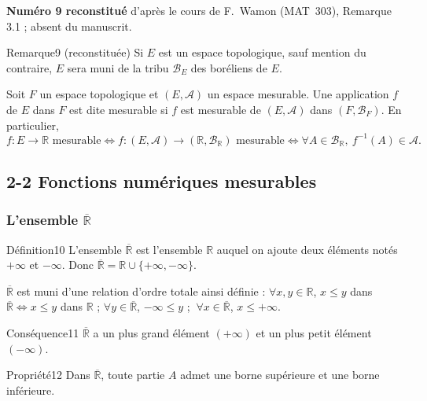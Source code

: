 \documentclass[11pt,a4paper]{article}
\newcommand{\R}{\mathbb{R}}
\newcommand{\Rb}{\overline{\mathbb{R}}}
\newcommand{\A}{\mathscr{A}}
\newcommand{\B}{\mathscr{B}}
\begin{document}
\begin{note}
\textbf{Numéro 9 reconstitué} d'après le cours de F.~Wamon (MAT~303), Remarque 3.1 ; absent du manuscrit.
\end{note}

\begin{enonce}{Remarque}{9 \textnormal{(reconstituée)}}
Si $E$ est un espace topologique, sauf mention du contraire, $E$ sera muni de la tribu $\B_E$ des boréliens de $E$.

Soit $F$ un espace topologique et $(E,\A)$ un espace mesurable. Une application $f$ de $E$ dans $F$ est dite
mesurable si $f$ est mesurable de $(E,\A)$ dans $(F,\B_F)$. En particulier,
\[
  f:E\to\R \text{ mesurable}\iff f:(E,\A)\to(\R,\B_{\R}) \text{ mesurable}\iff \forall A\in\B_{\R},\ f^{-1}(A)\in\A .
\]
\end{enonce}

\subsection*{2-2 Fonctions numériques mesurables}
\subsubsection*{L'ensemble $\Rb$}

\begin{enonce}{Définition}{10}
L'ensemble $\Rb$ est l'ensemble $\R$ auquel on ajoute deux éléments notés $+\infty$ et $-\infty$.
Donc $\Rb=\R\cup\{+\infty,-\infty\}$.

$\Rb$ est muni d'une relation d'ordre totale ainsi définie :
$\forall x,y\in\R$, $x\le y$ dans $\Rb\iff x\le y$ dans $\R$ ;
$\forall y\in\Rb$, $-\infty\le y$ ; $\ \forall x\in\Rb$, $x\le+\infty$.
\end{enonce}

\begin{enonce}{Conséquence}{11}
$\Rb$ a un plus grand élément $(+\infty)$ et un plus petit élément $(-\infty)$.
\end{enonce}

\begin{enonce}{Propriété}{12}
Dans $\Rb$, toute partie $A$ admet une borne supérieure et une borne inférieure.
\end{enonce}
\end{document}
